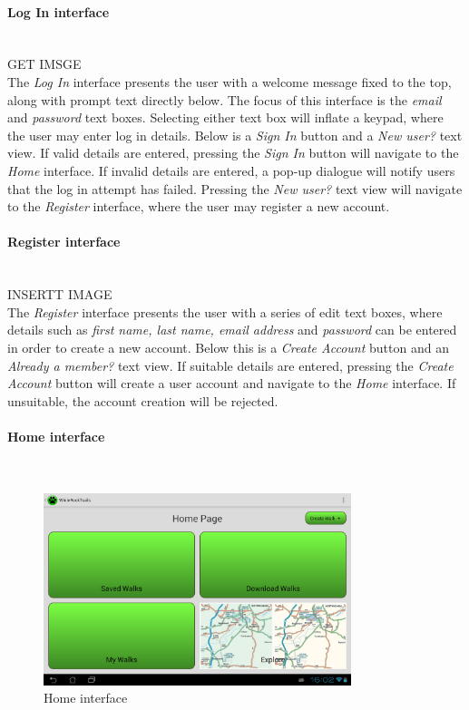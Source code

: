 \documentclass[11pt,a4paper]{report}
\begin{document}
\paragraph*{Log In interface}\mbox{}\\

GET IMSGE \\

The \emph{Log In} interface presents the user with a welcome message fixed to the top, along with prompt text directly below. The focus of this interface is the \emph{email} and \emph{password} text boxes. Selecting either text box will inflate a keypad, where the user may enter log in details. Below is a \emph{Sign In} button and a \emph{New user?} text view. If valid details are entered, pressing the \emph{Sign In} button will navigate to the \emph{Home} interface. If invalid details are entered, a pop-up dialogue will notify users that the log in attempt has failed. Pressing the \emph{New user?} text view will navigate to the \emph{Register} interface, where the user may register a new account.

\paragraph{Register interface}\mbox{}\\
INSERTT IMAGE\\

The \emph{Register} interface presents the user with a series of edit text boxes, where details such as \emph{first name, last name, email address} and \emph{password} can be entered in order to create a new account. Below this is a \emph{Create Account} button and an \emph{Already a member?} text view. If suitable details are entered, pressing the \emph{Create Account} button will create a user account and navigate to the \emph{Home} interface. If unsuitable, the account creation will be rejected.

\paragraph*{Home interface}\mbox{}\\

\begin{figure}[H]
    \centering
    \includegraphics[width=0.8\textwidth]{chris/home}
    \caption{Home interface}
    \label{fig:home}
\end{figure}
\end{document}
